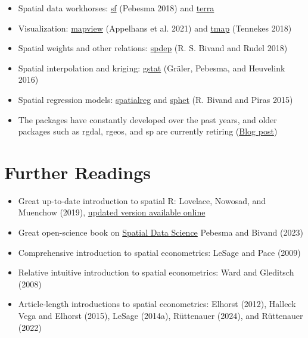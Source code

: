 \documentclass[
  letterpaper,
  DIV=11,
  numbers=noendperiod]{scrreprt}
\begin{document}
\begin{itemize}
\item
  Spatial data workhorses:
  \href{https://cran.r-project.org/web/packages/sf/index.html}{sf}
  (Pebesma 2018) and
  \href{https://cran.r-project.org/web/packages/terra/index.html}{terra}
\item
  Visualization:
  \href{https://cran.r-project.org/web/packages/mapview/index.html}{mapview}
  (Appelhans et al. 2021) and
  \href{https://cran.r-project.org/web/packages/tmap/index.html}{tmap}
  (Tennekes 2018)
\item
  Spatial weights and other relations:
  \href{https://cran.r-project.org/web/packages/stars/index.html}{spdep}
  (R. S. Bivand and Rudel 2018)
\item
  Spatial interpolation and kriging:
  \href{https://cran.r-project.org/web/packages/gstat/index.html}{gstat}
  (Gräler, Pebesma, and Heuvelink 2016)
\item
  Spatial regression models:
  \href{https://cran.r-project.org/web/packages/spatialreg/index.html}{spatialreg}
  and
  \href{https://cran.r-project.org/web/packages/sphet/index.html}{sphet}
  (R. Bivand and Piras 2015)
\item
  The packages have constantly developed over the past years, and older
  packages such as rgdal, rgeos, and sp are currently retiring
  (\href{https://geocompx.org/post/2023/rgdal-retirement/}{Blog post})
\end{itemize}

\hypertarget{further-readings}{%
\section*{Further Readings}\label{further-readings}}


\begin{itemize}
\item
  Great up-to-date introduction to spatial R: Lovelace, Nowosad, and
  Muenchow (2019), \href{https://geocompr.robinlovelace.net/}{updated
  version available online}
\item
  Great open-science book on
  \href{https://www.r-spatial.org/book}{Spatial Data Science} Pebesma
  and Bivand (2023)
\item
  Comprehensive introduction to spatial econometrics: LeSage and Pace
  (2009)
\item
  Relative intuitive introduction to spatial econometrics: Ward and
  Gleditsch (2008)
\item
  Article-length introductions to spatial econometrics: Elhorst (2012),
  Halleck Vega and Elhorst (2015), LeSage (2014a), Rüttenauer (2024),
  and Rüttenauer (2022)
\end{itemize}
\end{document}
